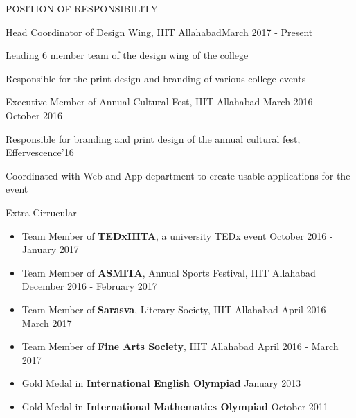 \documentclass{resume} %
\begin{document}
\begin{rSection}{POSITION OF RESPONSIBILITY}

\begin{rSubsection}{Head Coordinator of Design Wing, IIIT Allahabad}{March 2017 - Present}{}{}           
\item Leading 6 member team of the design wing of the college
%
%
\item Responsible for the print design and branding of various college events 
\end{rSubsection}  


\begin{rSubsection}{Executive Member of Annual Cultural Fest, IIIT Allahabad} {March 2016 - October 2016}{}{} 
\item Responsible for branding and print design of the annual cultural fest, Effervescence'16            
\item Coordinated with Web and App department to create usable applications for the event
\end{rSubsection}

\end{rSection}
  


\begin{rSection}{Extra-Cirrucular} \itemsep -2pt   

\begin{itemize}
 
\item Team Member of \textbf{TEDxIIITA}, a university TEDx event \hfill October 2016 - January 2017
\item Team Member of \textbf{ASMITA}, Annual Sports Festival, IIIT Allahabad  
\hfill December 2016 - February 2017
\item Team Member of \textbf{Sarasva}, Literary Society, IIIT Allahabad \hfill April 2016 - March 2017
\item Team Member of \textbf{Fine Arts Society}, IIIT Allahabad \hfill April 2016 - March 2017
\item Gold Medal in \textbf{International English Olympiad} \hfill January 2013
\item  Gold Medal in \textbf{International Mathematics Olympiad} \hfill October 2011 
  
\end{itemize}  


\end{rSection} 

\end{document}
